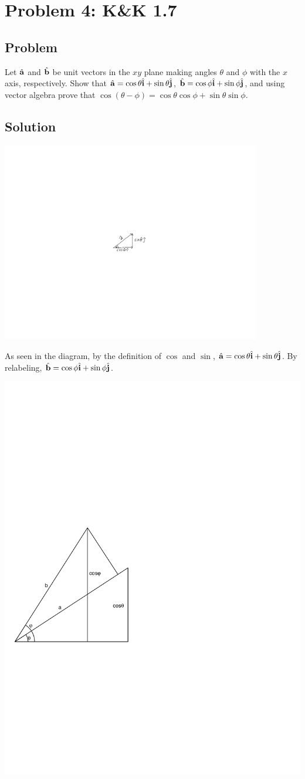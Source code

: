 \documentclass[solutions]{esg8012pset}
\providecommand{\uvec}[1]{{\hat{\bf{#1}}}}
\begin{document}
\section*{Problem 4: K\&K 1.7}
\subsection*{Problem}
  Let $\uvec a$ and $\uvec b$ be unit vectors in the $xy$ plane making angles $\theta$ and $\phi$ with the $x$ axis,
  respectively. Show that $\uvec a = \cos\theta\uvec i + \sin\theta\uvec j$, $\uvec b = \cos\phi\uvec i + \sin\phi\uvec j$, and using vector algebra prove
that $\cos(\theta -\phi ) = \cos\theta \cos\phi + \sin\theta \sin\phi$.
\subsection*{Solution}
  \includegraphics[width=0.85\textwidth]{ps01_Diagram_1}

  As seen in the diagram, by the definition of $\cos$ and $\sin$, $\uvec a = \cos\theta\uvec i + \sin\theta\uvec j$.  By relabeling, $\uvec b = \cos\phi\uvec i + \sin\phi\uvec j$.
  \begin{center}\includegraphics[width=.33\textwidth]{ps01_Diagram_2}\end{center}
\end{document}
